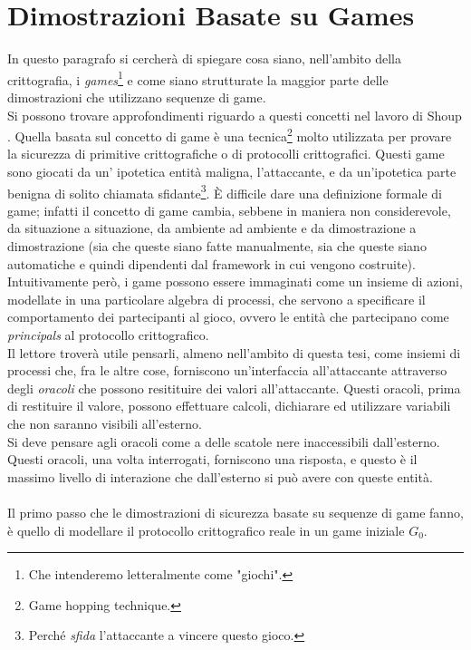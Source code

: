 \documentclass[a4paper,openright,twoside,12pt]{report}
\begin{document}
\section{Dimostrazioni Basate su Games}
In questo paragrafo si cercher\`a di spiegare cosa siano, nell'ambito della crittografia, i \emph{games}\footnote{Che intenderemo letteralmente come "giochi".} e come siano strutturate la
maggior parte delle dimostrazioni che utilizzano sequenze di game.\\Si possono trovare approfondimenti riguardo a questi concetti nel lavoro di Shoup \cite{shoup}.
Quella basata sul concetto di game \`e una tecnica\footnote{Game hopping technique.} molto utilizzata per provare la sicurezza di primitive crittografiche o di protocolli crittografici.
Questi game sono giocati da un' ipotetica entit\`a maligna, l'attaccante, e da un'ipotetica parte benigna di solito chiamata sfidante\footnote{Perch\'e \emph{sfida} l'attaccante a 
vincere questo gioco.}. 
\`E difficile dare una definizione formale di game; infatti il concetto di game cambia, sebbene in maniera non considerevole, da situazione a situazione, da ambiente ad ambiente e 
da dimostrazione a dimostrazione (sia che queste siano fatte manualmente, sia che queste siano automatiche e quindi dipendenti dal framework in cui vengono costruite).
Intuitivamente per\`o, i game possono essere immaginati come un insieme di azioni, modellate in una particolare algebra di processi, 
che servono a specificare il comportamento dei partecipanti al gioco, ovvero le entit\`a che partecipano come \emph{principals} al protocollo crittografico.\\
Il lettore trover\`a utile pensarli, almeno nell'ambito di questa tesi, come insiemi di processi che, fra le altre cose, forniscono un'interfaccia all'attaccante attraverso degli 
\emph{oracoli} che possono resitituire dei valori all'attaccante. Questi oracoli, prima di restituire il valore, possono effettuare calcoli, dichiarare ed utilizzare variabili che non saranno
visibili all'esterno.\\Si deve pensare agli oracoli come a delle scatole nere inaccessibili dall'esterno. Questi oracoli, una volta interrogati, forniscono una risposta,
e questo \`e il massimo livello di interazione che dall'esterno si pu\`o avere con queste entit\`a.\\ \\
Il primo passo che le dimostrazioni di sicurezza basate su sequenze di game fanno, \`e quello di modellare il protocollo crittografico reale in un game iniziale $G_0$.
\end{document}
